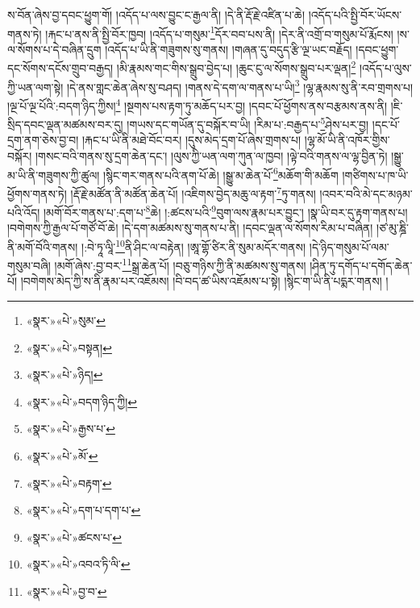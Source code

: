 ས་བོན་ཞེས་བྱ་དབང་ཕྱུག་གོ། །འདོད་པ་ལས་བྱུང་ང་རྒྱལ་ནི། །དེ་ནི་རྡོ་རྗེ་འཛིན་པ་ཆེ། །འདོད་པའི་སྤྱི་བོར་ཡོངས་གནས་ཏེ། །རྐང་པ་ནས་ནི་སྤྱི་བོར་ཁྱབ། །འདོད་པ་གསུམ་\footnote{«སྣར་»«པེ་»སུམ་}དོར་བབ་པས་ནི། །དེར་ནི་འགྲོ་བ་གསུམ་པོ་རྨོངས། །ས་ལ་སོགས་པ་དེ་བཞིན་དྲུག །འདོད་པ་ཡི་ནི་གཟུགས་སུ་གནས། །གཞན་དུ་བདུད་རྩི་ལྔ་ཡང་བརྗོད། །དབང་ཕྱུག་དང་སོགས་དངོས་གྲུབ་བརྒྱད། །མི་རྣམས་གང་གིས་སྒྲུབ་བྱེད་པ། །ཆུང་ངུ་ལ་སོགས་སྒྲུབ་པར་ལྡན།\footnote{«སྣར་»«པེ་»བསྟན།} །འདོད་པ་ལུས་ཀྱི་ཡན་ལག་སྟེ། །དེ་ནས་གླང་ཆེན་ཞེས་སུ་བཤད། །གནས་དེ་དག་ལ་གནས་པ་ཡི།\footnote{«སྣར་»«པེ་»ཉིད།} །ལྷ་རྣམས་སུ་ནི་རབ་གྲགས་པ། །ལྔ་པོ་ལྔ་པོའི་:བདག་ཉིད་ཀྱིས།\footnote{«སྣར་»«པེ་»བདག་ཉིད་ཀྱི།} །སྔགས་པས་རྟག་ཏུ་མཆོད་པར་བྱ། །དབང་པོ་ཕྱོགས་ནས་བརྩམས་ནས་ནི། །ཇི་སྲིད་དབང་ལྡན་མཚམས་བར་དུ། །གཡས་དང་གཡོན་དུ་བསྐོར་བ་ཡི། །རིམ་པ་:བརྒྱད་པ་\footnote{«སྣར་»«པེ་»རྒྱས་པ་}ཤེས་པར་བྱ། །དང་པོ་དྲག་ནག་ཅེས་བྱ་བ། །རྐང་པ་ཡི་ནི་མཐེ་བོང་བར། །དུས་མེད་དྲག་པོ་ཞེས་གྲགས་པ། །ལྷ་མོ་ཡི་ནི་འཁོར་གྱིས་བསྐོར། །གསང་བའི་གནས་སུ་དྲག་ཆེན་དང་། །ལུས་ཀྱི་ཡན་ལག་ཀུན་ལ་ཁྱབ། །ལྟེ་བའི་གནས་ལ་ལྷ་བྱིན་ཏེ། །སྒྱུ་མ་ཡི་ནི་གཟུགས་ཀྱི་ཚུལ། །སྙིང་གར་གནས་པའི་ནག་པོ་ཆེ། །སྒྱུ་མ་ཆེན་པོ་\footnote{«སྣར་»«པེ་»མོ་}མཆོག་གི་མཆོག །གཙིགས་པ་ཁ་ཡི་ཕྱོགས་གནས་ཏེ། །རྡོ་རྗེ་མཚོན་ནི་མཚོན་ཆེན་པོ། །འཇིགས་བྱེད་མཆུ་ལ་རྟག་\footnote{«སྣར་»«པེ་»བརྟག་}ཏུ་གནས། །འབར་བའི་མེ་དང་མཉམ་པའི་འོད། །མགོ་བོར་གནས་པ་:དག་པ་\footnote{«སྣར་»«པེ་»དག་པ་དག་པ་}ཆེ། །:ཚངས་པའི་\footnote{«སྣར་»«པེ་»ཚངས་པ་}བུག་ལས་རྣམ་པར་བྱུང་། །སྣ་ཡི་བར་དུ་རྟག་གནས་པ། །བགེགས་ཀྱི་རྒྱལ་པོ་གཙོ་བོ་ཆེ། །དེ་དག་མཚམས་སུ་གནས་པ་ནི། །དབང་ལྡན་ལ་སོགས་རིམ་པ་བཞིན། །ཙ་མུ་ཎྜི་ནི་མགོ་བོའི་གནས། །:བེ་ཏཱ་ལཱི་\footnote{«སྣར་»«པེ་»འབའ་ཏི་ལི་}ནི་ཤིང་ལ་བརྟེན། །ཨཱ་གྷོ་ཙིར་ནི་སུམ་མདོར་གནས། །དེ་ཉིད་གསུམ་པོ་ལམ་གསུམ་བཞི། །མགོ་ཞེས་:བྱ་བར་\footnote{«སྣར་»«པེ་»བྱ་བ་}སྒྲ་ཆེན་པོ། །བཅུ་གཉིས་ཀྱི་ནི་མཚམས་སུ་གནས། །ཤིན་ཏུ་དགོད་པ་དགོད་ཆེན་པོ། །བགེགས་མེད་ཀྱི་ས་ནི་རྣམ་པར་འཇོམས། །བི་བད་ཚ་ཡིས་འཇོམས་པ་སྟེ། །སྙིང་ག་ཡི་ནི་པདྨར་གནས། །
